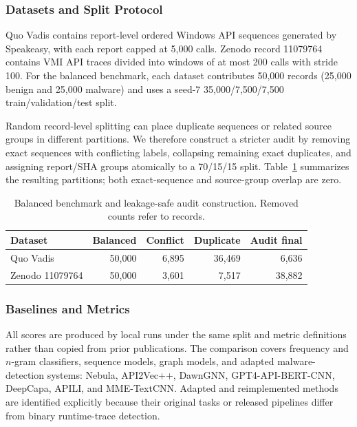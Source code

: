 \subsubsection{Datasets and Split Protocol}
Quo Vadis contains report-level ordered Windows API sequences generated by
Speakeasy, with each report capped at 5,000 calls.  Zenodo record 11079764
contains VMI API traces divided into windows of at most 200 calls with stride
100.  For the balanced benchmark, each dataset contributes 50,000 records
(25,000 benign and 25,000 malware) and uses a seed-7
35,000/7,500/7,500 train/validation/test split.

Random record-level splitting can place duplicate sequences or related source
groups in different partitions.  We therefore construct a stricter audit by
removing exact sequences with conflicting labels, collapsing remaining exact
duplicates, and assigning report/SHA groups atomically to a 70/15/15 split.
Table~\ref{tab:dataset-protocol} summarizes the resulting partitions; both
exact-sequence and source-group overlap are zero.

\begin{table}[!b]
\caption{Balanced benchmark and leakage-safe audit construction.  Removed
counts refer to records.}
\label{tab:dataset-protocol}
\centering
\scriptsize
\setlength{\tabcolsep}{3.5pt}
\begin{tabular}{lrrrr}
\hline
Dataset & Balanced & Conflict & Duplicate & Audit final \\
\hline
Quo Vadis & 50,000 & 6,895 & 36,469 & 6,636 \\
Zenodo 11079764 & 50,000 & 3,601 & 7,517 & 38,882 \\
\hline
\end{tabular}
\end{table}

\subsubsection{Baselines and Metrics}
All scores are produced by local runs under the same split and metric
definitions rather than copied from prior publications.  The comparison
covers frequency and $n$-gram classifiers, sequence models, graph models, and
adapted malware-detection systems: Nebula, API2Vec++, DawnGNN,
GPT4-API-BERT-CNN, DeepCapa, APILI, and MME-TextCNN.  Adapted and
reimplemented methods are identified explicitly because their original tasks
or released pipelines differ from binary runtime-trace detection.

